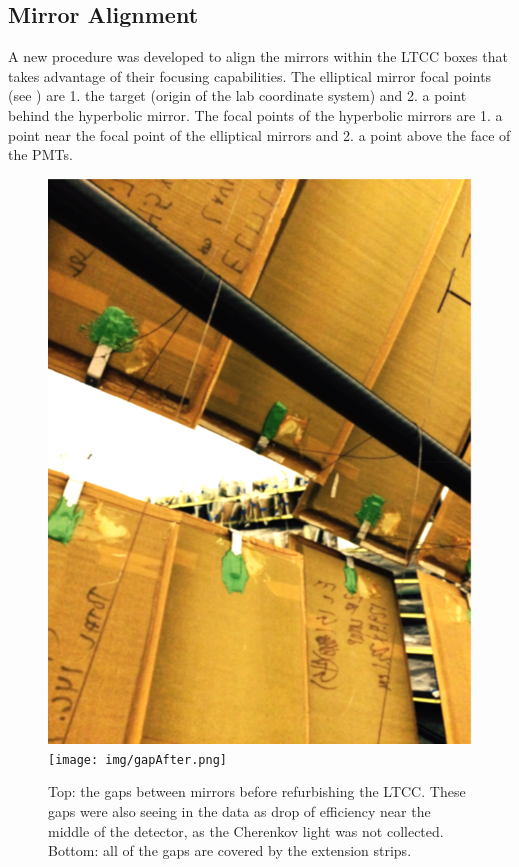 \subsection{Mirror Alignment}
\label{sec:mirrorAlignment}

A new procedure was developed to align the mirrors within the LTCC boxes that takes advantage of their focusing
capabilities. The elliptical mirror focal points (see ) are 1. the target (origin of the lab
coordinate system) and 2. a point behind the hyperbolic mirror. The focal points of the hyperbolic mirrors are 1. a
point near the focal point of the elliptical mirrors and 2. a point above the face of the PMTs.

\begin{figure}[hb]
\centering
	\includegraphics[width=0.98\columnwidth, height=0.7\columnwidth]{img/gapBefore.png}
	\texttt{[image: img/gapAfter.png]}
	\caption{Top: the gaps between mirrors before refurbishing the LTCC. These gaps were also seeing in the data
          as drop of efficiency near the middle of the detector, as the Cherenkov light was not collected. Bottom: all of
          the gaps are covered by the extension strips.}
	\label{fig:gapBeforeAndAfter}
\end{figure}

